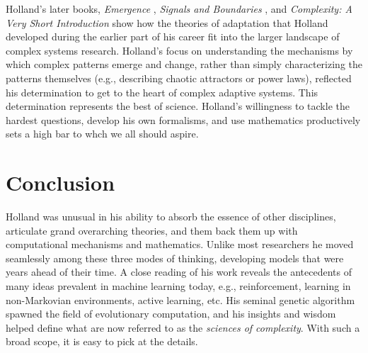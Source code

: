 \documentclass{sig-alternate}
\begin{document}



Holland's later books, \emph{Emergence} \cite{Holland2000},
\emph{Signals and Boundaries} \cite{Holland2012}, and
\emph{Complexity: A Very Short Introduction} \cite{Holland2014} show how the
theories of adaptation that Holland developed during the earlier part
of his career fit into the larger landscape of complex systems
research.  Holland's focus on understanding the mechanisms by which complex patterns emerge and change,
rather than simply characterizing the patterns themselves (e.g.,
describing chaotic attractors or power laws), reflected his
determination to get to the heart of complex adaptive systems.
This determination represents the best of science.  Holland's
willingness to tackle the hardest questions, develop his own
formalisms, and use mathematics productively sets a high bar to whch we
all should aspire.



\section{Conclusion}

Holland was unusual in his ability to absorb the essence of other
disciplines, articulate grand overarching
theories, and them back them up with computational mechanisms and
mathematics.  Unlike most researchers he moved seamlessly among these
three modes of thinking, developing models that were years ahead of their time.  A
close reading of his work reveals the antecedents of many ideas prevalent in
machine learning today, e.g., reinforcement, learning in non-Markovian
environments, active learning, etc.   His seminal genetic algorithm
spawned the field of evolutionary computation, and his insights
and wisdom helped define what are now referred to as the
\emph{sciences of complexity}.   With such a broad scope, it is easy
to pick at the details.
\end{document}
